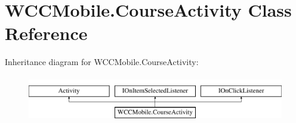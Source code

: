 \hypertarget{class_w_c_c_mobile_1_1_course_activity}{}\section{W\+C\+C\+Mobile.\+Course\+Activity Class Reference}
\label{class_w_c_c_mobile_1_1_course_activity}
Inheritance diagram for W\+C\+C\+Mobile.\+Course\+Activity\+:\begin{figure}[H]
\begin{center}
\leavevmode
\includegraphics[height=2.000000cm]{class_w_c_c_mobile_1_1_course_activity}
\end{center}
\end{figure}
